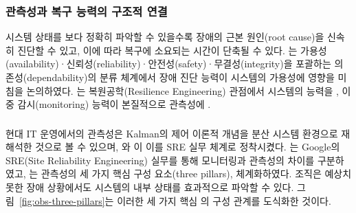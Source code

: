 \subsubsection{ 관측성과 복구 능력의 구조적 연결}
\label{subsubsec:obs-recovery-link}

시스템 상태를 보다 정확히 파악할 수 있을수록 장애의 근본 원인(root cause)을
신속히 진단할 수 있고, 이에 따라 복구에 소요되는 시간이 단축될 수 있다.
\citet{avizienis2004basic}는 가용성(availability)·신뢰성(reliability)·안전성(safety)·무결성(integrity)을 포괄하는 의존성(dependability)의 분류 체계에서
장애 진단 능력이 시스템의 가용성에  영향을 미침을 논의하였다.
\citet{hollnagel2006resilience}는 복원공학(Resilience Engineering) 관점에서 시스템의
 능력을 , 이 중 감시(monitoring) 능력이 본질적으로
관측성에 .


\subsubsection{ }
\label{subsubsec:obs-sre-pillars}

현대 IT 운영에서의 관측성은 Kalman의 제어 이론적 개념을 분산 시스템
환경으로 재해석한 것으로 볼 수 있으며, \citet{beyer2016sre}와
\citet{majors2022observability}이 이를 SRE 실무 체계로 정착시켰다.
\citet{beyer2016sre}는 Google의 SRE(Site Reliability Engineering)
실무를 통해 모니터링과 관측성의 차이를 구분하였고,
\citet{majors2022observability}는 관측성의 세 가지 핵심 구성 요소(three pillars),  체계화하였다.
 조직은 예상치 못한 장애 상황에서도
시스템의 내부 상태를 효과적으로 파악할 수 있다.
\p{[}그림~\ref{fig:obs-three-pillars}\p{]}는 이러한 세 가지 핵심 의 구성 관계를 도식화한 것이다.


